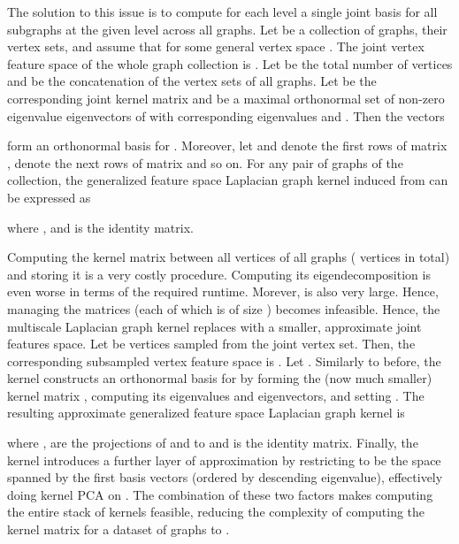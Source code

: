 \documentclass[twoside,11pt]{article}
\begin{document}
The solution to this issue is to compute for each level  a single joint basis for all subgraphs at the given level across all graphs.
Let  be a collection of graphs,  their vertex sets, and assume that  for some general vertex space .
The joint vertex feature space of the whole graph collection is .
Let  be the total number of vertices and  be the concatenation of the vertex sets of all graphs.
Let  be the corresponding joint kernel matrix and  be a maximal orthonormal set of non-zero eigenvalue eigenvectors of  with corresponding eigenvalues  and .
Then the vectors

form an orthonormal basis for .
Moreover, let  and  denote the first  rows of matrix ,  denote the next  rows of matrix  and so on.
For any pair of graphs  of the collection, the generalized feature space Laplacian graph kernel induced from  can be expressed as

where ,  and  is the  identity matrix.

Computing the kernel matrix between all vertices of all graphs ( vertices in total) and storing it is a very costly procedure.
Computing its eigendecomposition is even worse in terms of the required runtime.
Morever,  is also very large.
Hence, managing the  matrices (each of which is of size ) becomes infeasible.
Hence, the multiscale Laplacian graph kernel replaces  with a smaller, approximate joint features space.
Let  be  vertices sampled from the joint vertex set.
Then, the corresponding subsampled vertex feature space is .
Let .
Similarly to before, the kernel constructs an orthonormal basis  for  by forming the (now much smaller) kernel matrix , computing its eigenvalues and eigenvectors, and setting . 
The resulting approximate generalized feature space Laplacian graph kernel is

where ,  are the projections of  and  to  and  is the  identity matrix.
Finally, the kernel introduces a further layer of approximation by restricting  to be the space spanned by the first  basis vectors (ordered by descending eigenvalue), effectively doing kernel PCA on .
The combination of these two factors makes computing the entire stack of kernels feasible, reducing the complexity of computing the kernel matrix for a dataset of  graphs to .
\end{document}
